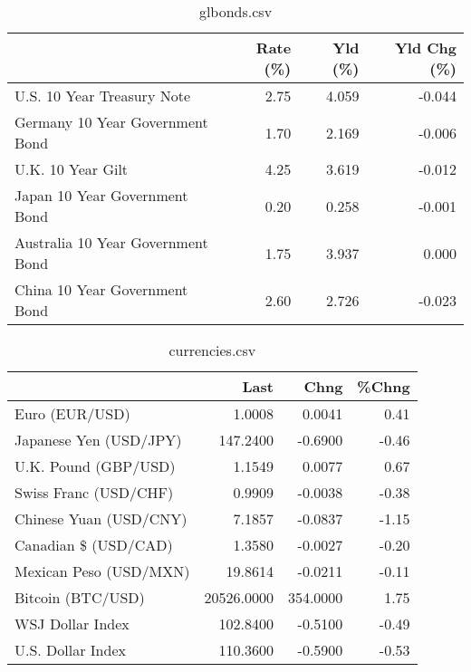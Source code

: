 \documentclass{article}%
\begin{document}
%


\begin{table}[htbp]%
\caption{glbonds.csv}%
\centering%
\begin{adjustbox}{width=1\textwidth}%
\begin{tabular}{lrrr}
\toprule
                                  &  Rate (\%) &  Yld (\%) &  Yld Chg (\%) \\
\midrule
       U.S. 10 Year Treasury Note &      2.75 &    4.059 &       -0.044 \\
  Germany 10 Year Government Bond &      1.70 &    2.169 &       -0.006 \\
                U.K. 10 Year Gilt &      4.25 &    3.619 &       -0.012 \\
    Japan 10 Year Government Bond &      0.20 &    0.258 &       -0.001 \\
Australia 10 Year Government Bond &      1.75 &    3.937 &        0.000 \\
    China 10 Year Government Bond &      2.60 &    2.726 &       -0.023 \\
\bottomrule
\end{tabular}
%
\end{adjustbox}%
\end{table}

%


\begin{table}[htbp]%
\caption{currencies.csv}%
\centering%
\begin{adjustbox}{width=1\textwidth}%
\begin{tabular}{lrrr}
\toprule
                       &       Last &     Chng &  \%Chng \\
\midrule
        Euro (EUR/USD) &     1.0008 &   0.0041 &   0.41 \\
Japanese Yen (USD/JPY) &   147.2400 &  -0.6900 &  -0.46 \\
  U.K. Pound (GBP/USD) &     1.1549 &   0.0077 &   0.67 \\
 Swiss Franc (USD/CHF) &     0.9909 &  -0.0038 &  -0.38 \\
Chinese Yuan (USD/CNY) &     7.1857 &  -0.0837 &  -1.15 \\
  Canadian \$ (USD/CAD) &     1.3580 &  -0.0027 &  -0.20 \\
Mexican Peso (USD/MXN) &    19.8614 &  -0.0211 &  -0.11 \\
     Bitcoin (BTC/USD) & 20526.0000 & 354.0000 &   1.75 \\
      WSJ Dollar Index &   102.8400 &  -0.5100 &  -0.49 \\
     U.S. Dollar Index &   110.3600 &  -0.5900 &  -0.53 \\
\bottomrule
\end{tabular}
%
\end{adjustbox}%
\end{table}

%
\end{document}
